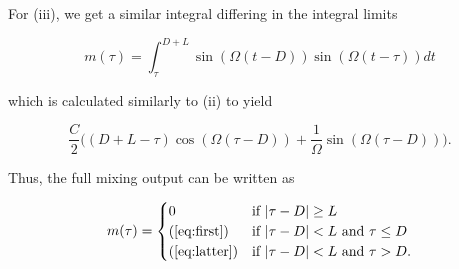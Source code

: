 \begin{appendices}
For (iii), we get a similar integral differing in the integral limits

\begin{equation}
	m(\tau) 
	= \int_\tau^{D+L}\sin(\Omega(t-D))\sin(\Omega(t-\tau))dt
\end{equation}

which is calculated similarly to (ii) to yield

\begin{equation}\label{eq:latter}
	\frac{C}{2}\Big( (D + L - \tau)\cos(\Omega(\tau - D))
	+ \frac{1}{\Omega}\sin(\Omega(\tau - D))\Big).
\end{equation}

Thus, the full mixing output can be written as

\begin{equation}
	m(\tau) = \begin{cases}
		0 & \text{if $|\tau-D|\geq L$} \\
		\text{(\ref{eq:first})} & \text{if $|\tau-D| < L$ and $\tau \leq D$} \\
		\text{(\ref{eq:latter})} & \text{if $|\tau-D| < L$ and $\tau>D$}.
	\end{cases}
\end{equation}

\end{appendices}



